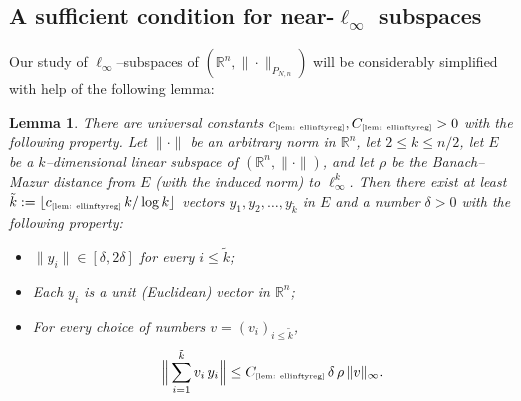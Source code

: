 \documentclass[11pt]{amsart}
\newtheorem{lemma}[theorem]{Lemma}
\theoremstyle{definition}
\theoremstyle{plain}
\newcommand{\R}{\mathbb{R}}
\def\R{{\mathbb R}}
\begin{document}
\subsection{A sufficient condition for near-$\ell_\infty$ subspaces}
Our study of $\ell_\infty$--subspaces of $(\R^n,\|\cdot\|_{P_{N,n}})$
will be considerably simplified with help of the following lemma:
\begin{lemma}\label{lem: ellinftyreg}
There are universal constants
$c_{\text{\tiny\ref{lem: ellinftyreg}}},
C_{\text{\tiny\ref{lem: ellinftyreg}}}>0$
with the following property.
Let $\|\cdot\|$ be an arbitrary norm in $\R^n$,
let $2\leq k\leq n/2$, let $E$
be a $k$--dimensional linear subspace of $(\R^n,\|\cdot\|)$,
and let $\rho$ be the Banach--Mazur distance from
$E$ (with the induced norm) to $\ell_\infty^k$.
Then there exist at least $\tilde k:=\lfloor c_{\text{\tiny\ref{lem: ellinftyreg}}}\,k/\log k\rfloor$
vectors $y_1,y_2,\dots,y_{\tilde k}$
in $E$ and a number $\delta>0$ with the following property:
\begin{itemize}
    \item $\|y_i\|\in[\delta,2\delta]$
    for every $i\leq \tilde k$;
    \item Each $y_i$ is a unit (Euclidean) vector in $\R^n$;
    \item For every choice of numbers $v=(v_i)_{i\leq \tilde k}$,
    $$
    \Big\|
    \sum_{i=1}^{\tilde k}v_i\,y_i
    \Big\|\leq C_{\text{\tiny\ref{lem: ellinftyreg}}}\,\delta\,\rho\,\|v\|_\infty.
    $$
\end{itemize}
\end{lemma}
\end{document}
